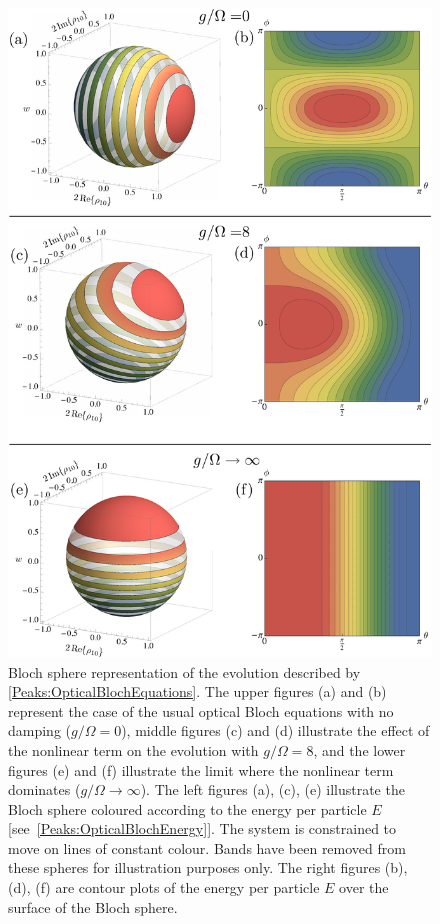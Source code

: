 \begin{figure}
    \centering
    \includegraphics[width=13cm]{BlochSpheres}
    \caption{Bloch sphere representation of the evolution described by \eqref{Peaks:OpticalBlochEquations}. The upper figures (a) and (b) represent the case of the usual optical Bloch equations with no damping ($g/\Omega=0$), middle figures (c) and (d) illustrate the effect of the nonlinear term on the evolution with $g/\Omega = 8$, and the lower figures (e) and (f) illustrate the limit where the nonlinear term dominates ($g/\Omega \rightarrow \infty$). The left figures (a), (c), (e) illustrate the Bloch sphere coloured according to the energy per particle $E$ [see~\eqref{Peaks:OpticalBlochEnergy}]. The system is constrained to move on lines of constant colour. Bands have been removed from these spheres for illustration purposes only. The right figures (b), (d), (f) are contour plots of the energy per particle $E$ over the surface of the Bloch sphere.
     \label{Peaks:BlochSphere}}
\end{figure}

